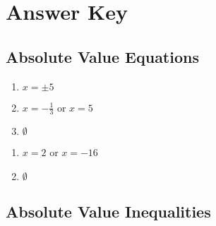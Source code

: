 \newpage

\section*{Answer Key}

\subsection*{Absolute Value Equations}

\begin{multicols}{3}
\begin{enumerate}
	\item $x = \pm 5$
	\item $x = -\frac{1}{3} \text{ or } x = 5$
	\item $\emptyset$
\end{enumerate}	\setcounter{Review}{\value{enumi}}
\end{multicols}
\begin{multicols}{3}
\begin{enumerate}	\setcounter{enumi}{\value{Review}}
	\item $x = 2$ or $x = -16$
	\item $\emptyset$
\end{enumerate}	\setcounter{Review}{\value{enumi}}
\end{multicols}



\subsection*{Absolute Value Inequalities}

